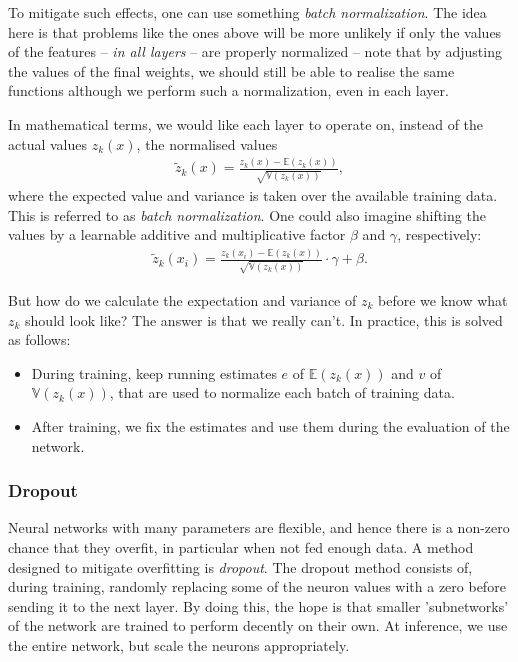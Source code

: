 \documentclass{article}
\begin{document}
To mitigate such effects, one can use something \emph{batch normalization}. The idea here is that problems like the ones above will be more unlikely if only the values of the features -- \emph{in all layers} --  are properly normalized -- note that by adjusting the values of the final weights, we should still be able to realise the same functions although we perform such a normalization, even in each layer.

In mathematical terms, we would like each layer to operate on, instead of the actual values $z_k(x)$, the normalised values
\begin{align*}
    \tilde{z}_k(x) = \frac{z_k(x) -\mathbb{E}(z_k(x))}{\sqrt{\mathbb{V}(z_k(x))}},
\end{align*}
where the expected value and variance is taken over the available training data. This is referred to as \emph{batch normalization}. One could also imagine shifting the values by a learnable additive and multiplicative factor $\beta$ and $\gamma$, respectively:
\begin{align*}
    \tilde{z}_k(x_i) = \frac{z_k(x_i) -\mathbb{E}(z_k(x))}{\sqrt{\mathbb{V}(z_k(x))}}\cdot \gamma + \beta.
\end{align*}

But how do we calculate the expectation and variance of $z_k$ before we know what $z_k$ should look like? The answer is that we really can't. In practice, this is solved as follows:
\begin{itemize}
    \item During training, keep running estimates $e$ of $\mathbb{E}(z_k(x))$ and $v$ of $\mathbb{V}(z_k(x))$, that are used to normalize each batch of training data.
    \item After training, we fix the estimates and use them during the evaluation of the network.
\end{itemize}


\subsubsection{Dropout} Neural networks with many parameters are flexible, and hence there is a non-zero chance that they overfit, in particular when not fed enough data. A method designed to mitigate overfitting is \emph{dropout}. The dropout method consists of, during training, randomly replacing some of the neuron values with a zero before sending it to the next layer. By doing this, the hope is that smaller 'subnetworks' of the network are trained to perform decently on their own. At inference, we use the entire network, but scale the neurons appropriately.
\end{document}
